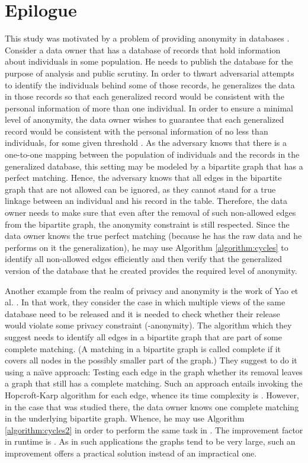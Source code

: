 \documentclass[times, 11pt]{article}
\begin{document}
\section{Epilogue}\label{epilogue}
This study was motivated by a problem of providing anonymity in databases \cite{GMT}. Consider a data owner that has a database
of records that hold information about individuals in some population. He needs to publish the database for the purpose of analysis and public scrutiny.
In order to thwart adversarial attempts to identify the individuals behind some of those records, he generalizes the data in those records so that each generalized
record would be consistent with the personal information of more than one individual.
In order to ensure a minimal level of anonymity, the data owner wishes to guarantee that each
generalized record would be consistent with the personal information of no less than  individuals, for some given threshold .
As the adversary knows that there is a one-to-one mapping
between the population of individuals and the records in the generalized database, this setting may be modeled by a bipartite graph that has a perfect matching.
Hence, the adversary knows that all edges
in the bipartite graph that are not allowed can be ignored, as they cannot stand for a true linkage between an individual and his
record in the table. Therefore, the data owner needs to make sure that even after
the removal of such non-allowed edges from the bipartite graph, the anonymity constraint is still respected. Since the data owner knows the true perfect matching (because
he has the raw data and he performs on it the generalization), he
may use Algorithm \ref{algorithm:cycles} to identify all non-allowed edges efficiently and then verify that the generalized version of the database that he created
provides the required level of anonymity.

Another example from the realm of privacy and anonymity is the work of Yao et al. \cite{YaoWJ05}. In that work, they consider the case
in which multiple views of the same database need to be released and it is needed to check whether their release would violate
some privacy constraint (-anonymity). The algorithm which they suggest needs to identify all edges in a bipartite graph that are part of
some complete matching. (A matching in a bipartite graph is called complete if it covers all nodes in the possibly smaller part of the graph.)
They suggest to do it using a na\"{\i}ve approach: Testing each edge in the graph whether its removal leaves a graph that still has a complete matching.
Such an approach entails invoking the Hopcroft-Karp algorithm for each edge, whence its time complexity is . However, in the case that was
studied there, the data owner knows one complete matching in the underlying bipartite graph. Whence, he may use Algorithm
\ref{algorithm:cycles2} in order to perform the same task in . The improvement factor in runtime is
. As in such applications the graphs tend to be very large, such an improvement offers a practical solution instead
of an impractical one.
\end{document}
